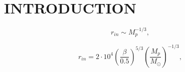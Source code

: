 \chapter{\color{red}INTRODUCTION}
\thispagestyle{empty}


\lipsum[1]
\begin{equation}
    r_{in} \sim M_p^{-1/3},
\end{equation}

\lipsum[2]

\begin{equation}
	r_{in} = 2 \cdot 10^{4} \left(\frac{\beta}{0.5}\right)^{5/3} \left(\frac{M_p}{M_{\odot}}\right)^{-1/3},
\end{equation}

\lipsum[3]